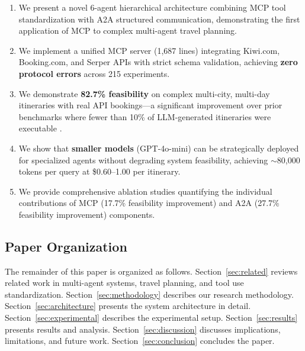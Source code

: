 \documentclass[preprint,review,12pt]{elsarticle}
\begin{document}
\begin{enumerate}
    \item We present a novel 6-agent hierarchical architecture combining MCP tool standardization with A2A structured communication, demonstrating the first application of MCP to complex multi-agent travel planning.
    
    \item We implement a unified MCP server (1,687 lines) integrating Kiwi.com, Booking.com, and Serper APIs with strict schema validation, achieving \textbf{zero protocol errors} across 215 experiments.
    
    \item We demonstrate \textbf{82.7\% feasibility} on complex multi-city, multi-day itineraries with real API bookings---a significant improvement over prior benchmarks where fewer than 10\% of LLM-generated itineraries were executable \citep{shen2025triptailor}.
    
    \item We show that \textbf{smaller models} (GPT-4o-mini) can be strategically deployed for specialized agents without degrading system feasibility, achieving $\sim$80,000 tokens per query at \$0.60--1.00 per itinerary.
    
    \item We provide comprehensive ablation studies quantifying the individual contributions of MCP (17.7\% feasibility improvement) and A2A (27.7\% feasibility improvement) components.
\end{enumerate}

\subsection{Paper Organization}

The remainder of this paper is organized as follows. Section~\ref{sec:related} reviews related work in multi-agent systems, travel planning, and tool use standardization. Section~\ref{sec:methodology} describes our research methodology. Section~\ref{sec:architecture} presents the system architecture in detail. Section~\ref{sec:experimental} describes the experimental setup. Section~\ref{sec:results} presents results and analysis. Section~\ref{sec:discussion} discusses implications, limitations, and future work. Section~\ref{sec:conclusion} concludes the paper.

\end{document}
